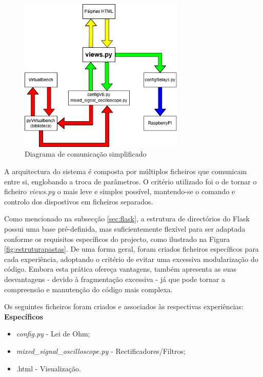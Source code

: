 \begin{figure}[hbtp]
	\centering
	\includegraphics[width=0.7\textwidth]{figures/Diagrama_simplificado.drawio.png}
	\caption{Diagrama de comunicação simplificado}
	\label{fig:diagramasimplificado}
\end{figure}

A arquitectura do sistema é composta por múltiplos ficheiros que comunicam entre si, englobando a troca de parâmetros. O critério utilizado foi o de tornar o ficheiro \textit{views.py} o mais leve e simples possível, mantendo-se o comando e controlo dos dispostivos em ficheiros separados.

Como mencionado na subsecção \ref{sec:flask}, a estrutura de directórios do Flask possui uma base pré-definida, mas suficientemente flexível para ser adaptada conforme os requisitos específicos do projecto, como ilustrado na Figura \ref{fig:estruturapastas}. De uma forma geral, foram criados ficheiros específicos para cada experiência, adoptando o critério de evitar uma excessiva modularização do código. Embora esta prática ofereça vantagens, também apresenta as suas desvantagens - devido à fragmentação excessiva - já que pode tornar a compreensão e manutenção do código mais complexa.

Os seguintes ficheiros foram criados e associados às respectivas experiências:
\\[1em]
\textbf{Específicos}
\begin{itemize}
	\item \textit{config.py} - Lei de Ohm;
	\item \textit{mixed\_signal\_oscilloscope.py} - Rectificadores/Filtros;
	\item {}.html - Visualização.
\end{itemize}

